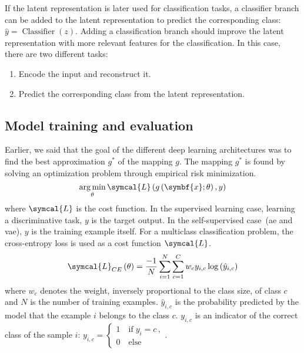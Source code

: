 \documentclass[../main.tex]{subfiles}
\begin{document}
	 If the latent representation is later used for classification tasks, a classifier branch can be added to the latent representation to predict the corresponding class: \(\hat{y} = \operatorname{Classifier}\left(z\right)\).
	 Adding a classification branch should improve the latent representation with more relevant features for the classification.
	 In this case, there are two different tasks:
	 \begin{enumerate}[nosep]
		 \item Encode the input and reconstruct it.
		 \item Predict the corresponding class from the latent representation.
	 \end{enumerate}

 \subsection{}

 \subsection{Model training and evaluation}
	 Earlier, we said that the goal of the different deep learning architectures was to find the best approximation \(g^{*}\) of the mapping \(g\).
	 The mapping \(g^{*}\) is found by solving an optimization problem through empirical risk minimization.
	 \begin{equation}
		 \argmin_{\theta} \symcal{L}\left(g\left(\symbf{x}; \theta\right), y\right) \label{eq:dl_opt}
	 \end{equation}
	 where \(\symcal{L}\) is the cost function.
	 In the supervised learning case, learning a discriminative task, \(y\) is the target output.
	 In the self-supervised case~(\gls{ae} and \gls{vae}), \(y\) is the training example itself.
	 For a multiclass classification problem, the cross-entropy loss is used as a cost function \(\symcal{L}\).
	 \begin{equation}
		 \symcal{L}_{CE}\left(\theta\right) = \frac{-1}{N}\sum_{i=1}^{N}\sum_{c=1}^{C} w_c y_{i,c}\log\left(\hat{y}_{i,c}\right)
	 \end{equation}
	 where \(w_c\) denotes the weight, inversely proportional to the class size, of class \(c\) and \(N\) is the number of training examples.
	 \(\hat{y}_{i,c}\) is the probability predicted by the model that the example \(i\) belongs to the class \(c\).
	 \(y_{i,c}\) is an indicator of the correct class of the sample \(i\):
	 \(
	 y_{i,c} = \begin{cases}
		 1 \quad \text{if}\; y_i = c \, , \\
		 0 \quad \text{else}
	 \end{cases}
	 \).
\end{document}
